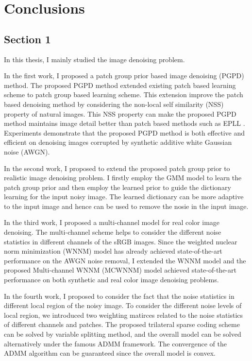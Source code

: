 %
\chapter{Conclusions}
\label{sec:conclusions}


\section{Section 1}
\label{sec:conclusions:sec1}
In this thesis, I mainly studied the image denoising problem. 

In the first work, I proposed a patch group prior based image denoising (PGPD) method. The proposed PGPD method extended existing patch based learning scheme to patch group based learning scheme. This extension improve the patch based denoising method by considering the non-local self similarity (NSS) property of natural images. This NSS property can make the proposed PGPD method maintains image detail better than patch based methods such as EPLL \cite{epll}. Experiments demonstrate that the proposed PGPD method is both effective and efficient on denoising images corrupted by synthetic additive white Gaussian noise (AWGN).

In the second work, I proposed to extend the proposed patch group prior to realistic image denoising problem. I firstly employ the GMM model to learn the patch group prior and then employ the learned prior to guide the dictionary learning for the input noisy image. The learned dictionary can be more adaptive to the input image and hence can be used to remove the nosie in the input image.

In the third work, I proposed a multi-channel model for real color image denoising. The multi-channel scheme helps to consider the different noise statistics in different channels of the sRGB images. Since the weighted nuclear norm minimization (WNNM) model has already achieved state-of-the-art performance on the AWGN noise removal, I extended the WNNM model and the proposed Multi-channel WNNM (MCWNNM) model achieved state-of-the-art performance on both synthetic and real color image denoising problems. 

In the fourth work, I proposed to consider the fact that the noise statistics in different local region of the noisy image. To consider the different noise levels of local region, we introduced two weighting matirces related to the noise statistics of different channels and patches. The proposed trilateral sparse coding scheme can be solved by variable splitting method, and the overall model can be solved alternatively under the famous ADMM framework. The convergence of the ADMM algorithm can be guaranteed since the overall model is convex.

